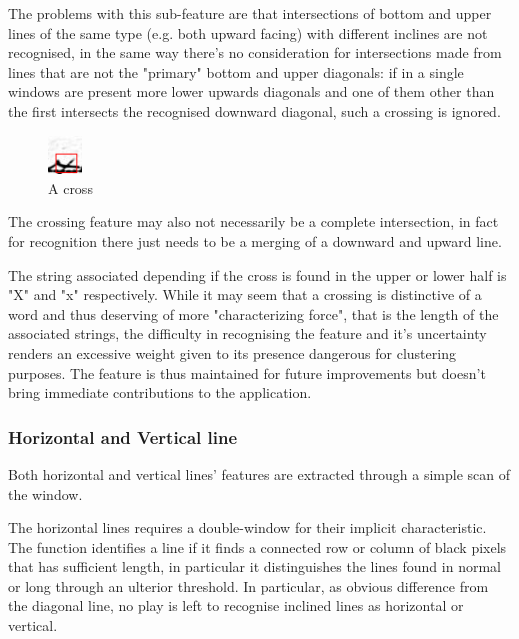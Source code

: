 The problems with this sub-feature are that intersections of bottom and upper lines of the same type (e.g. both upward facing) with different inclines are not recognised, in the same way there's no consideration for intersections made from lines that are not the "primary" bottom and upper diagonals: if in a single windows are present more lower upwards diagonals and one of them other than the first intersects the recognised downward diagonal, such a crossing is ignored.

\begin{figure}
  \vspace{-20pt}
  \begin{center}
    \includegraphics[width=0.08\textwidth]{images/cross.jpg}
  \end{center}
  \vspace{-20pt}
  \caption{A cross}
  \vspace{-10pt}
\end{figure}


The crossing feature may also not necessarily be a complete intersection, in fact for recognition there just needs to be a merging of a downward and upward line. 

The string associated depending if the cross is found in the upper or lower half is "X" and "x" respectively.
While it may seem that a crossing is distinctive of a word and thus deserving of more "characterizing force", that is the length of the associated strings, the difficulty in recognising the feature and it's uncertainty renders an excessive weight given to its presence dangerous for clustering purposes.
The feature is thus maintained for future improvements but doesn't bring immediate 
contributions to the application.

\subsubsection{Horizontal and Vertical line}
Both horizontal and vertical lines' features are extracted through
a simple scan of the window.

The horizontal lines requires a double-window for their implicit characteristic.
The function identifies a line if it finds a connected row or column of black pixels that has sufficient length, in particular it distinguishes the lines found in normal or long through an ulterior threshold.
In particular, as obvious difference from the diagonal line, no play is left to recognise inclined lines as horizontal or vertical.

